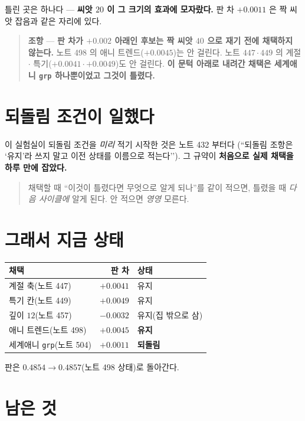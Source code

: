 \documentclass[11pt]{article}
\begin{document}
틀린 곳은 하나다 --- \textbf{씨앗 $20$ 이 그 크기의 효과에 모자랐다.}
판 차 $+0.0011$ 은 짝 씨앗 잡음과 같은 자리에 있다.

\begin{quote}
\textbf{조항} --- \textbf{판 차가 $+0.002$ 아래인 후보는 짝 씨앗 $40$ 으로
재기 전에 채택하지 않는다.} 노트 498 의 애니 트렌드($+0.0045$)는 안
걸린다. 노트 $447 \cdot 449$ 의 계절 $\cdot$ 특기($+0.0041 \cdot
+0.0049$)도 안 걸린다. \textbf{이 문턱 아래로 내려간 채택은 세계애니
\texttt{grp} 하나뿐이었고 그것이 틀렸다.}
\end{quote}

\section{되돌림 조건이 일했다}

이 실험실이 되돌림 조건을 \emph{미리} 적기 시작한 것은 노트 432 부터다
(``되돌림 조항은 `유지'라 쓰지 말고 이전 상태를 이름으로 적는다''). 그
규약이 \textbf{처음으로 실제 채택을 하루 만에 잡았다.}

\begin{quote}
채택할 때 ``이것이 틀렸다면 무엇으로 알게 되나''를 같이 적으면, 틀렸을 때
\emph{다음 사이클에} 알게 된다. 안 적으면 \emph{영영} 모른다.
\end{quote}

\section{그래서 지금 상태}

\begin{center}
\begin{tabular}{lrl}
\hline
채택 & 판 차 & 상태 \\
\hline
계절 축(노트 447) & $+0.0041$ & 유지 \\
특기 칸(노트 449) & $+0.0049$ & 유지 \\
깊이 $12$(노트 457) & $-0.0032$ & 유지(집 밖으로 삼) \\
애니 트렌드(노트 498) & $+0.0045$ & \textbf{유지} \\
세계애니 \texttt{grp}(노트 504) & $+0.0011$ & \textbf{되돌림} \\
\hline
\end{tabular}
\end{center}

판은 $0.4854 \to \mathbf{0.4857}$(노트 498 상태)로 돌아간다.

\section*{남은 것}
\end{document}
